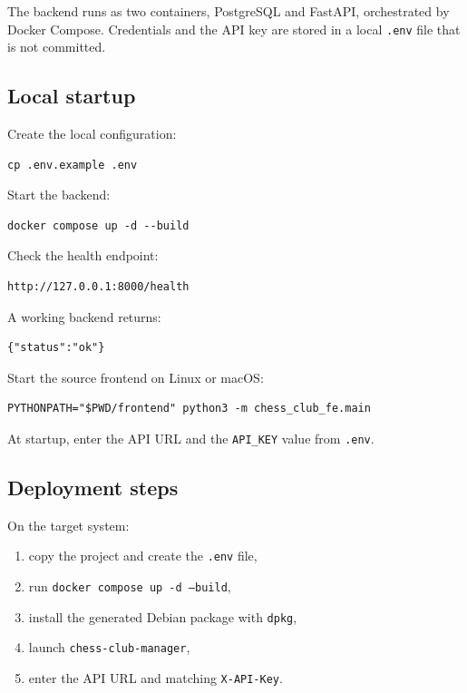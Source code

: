 \documentclass[11pt,a4paper]{article}
\begin{document}
The backend runs as two containers, PostgreSQL and FastAPI, orchestrated by
Docker Compose. Credentials and the API key are stored in a local
\texttt{.env} file that is not committed.

\subsection{Local startup}

Create the local configuration:

\begin{verbatim}
cp .env.example .env
\end{verbatim}

Start the backend:

\begin{verbatim}
docker compose up -d --build
\end{verbatim}

Check the health endpoint:

\begin{verbatim}
http://127.0.0.1:8000/health
\end{verbatim}

A working backend returns:

\begin{verbatim}
{"status":"ok"}
\end{verbatim}

Start the source frontend on Linux or macOS:

\begin{verbatim}
PYTHONPATH="$PWD/frontend" python3 -m chess_club_fe.main
\end{verbatim}

At startup, enter the API URL and the \texttt{API\_KEY} value from
\texttt{.env}.

\subsection{Deployment steps}

On the target system:

\begin{enumerate}[leftmargin=1.6em, topsep=2pt]
  \item copy the project and create the \texttt{.env} file,
  \item run \texttt{docker compose up -d --build},
  \item install the generated Debian package with \texttt{dpkg},
  \item launch \texttt{chess-club-manager},
  \item enter the API URL and matching \texttt{X-API-Key}.
\end{enumerate}
\end{document}
